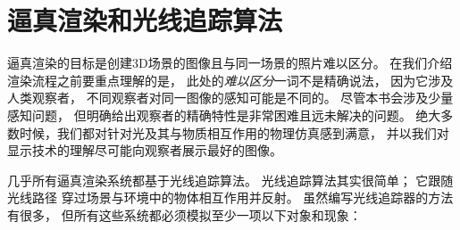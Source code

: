 \section{逼真渲染和光线追踪算法}\label{sec:逼真渲染和光线追踪算法}

逼真渲染的目标是创建3D场景的图像且与同一场景的照片难以区分。
在我们介绍渲染流程之前要重点理解的是，
此处的{\itshape 难以区分}一词不是精确说法，
因为它涉及人类观察者，
不同观察者对同一图像的感知可能是不同的。
尽管本书会涉及少量感知问题，
但明确给出观察者的精确特性是非常困难且远未解决的问题。
绝大多数时候，我们都对针对光及其与物质相互作用的物理仿真感到满意，
并以我们对显示技术的理解尽可能向观察者展示最好的图像。

几乎所有逼真渲染系统都基于光线追踪算法。
光线追踪算法其实很简单；
它跟随光线路径
穿过场景与环境中的物体相互作用并反射。
虽然编写光线追踪器的方法有很多，
但所有这些系统都必须模拟至少一项以下对象和现象：
